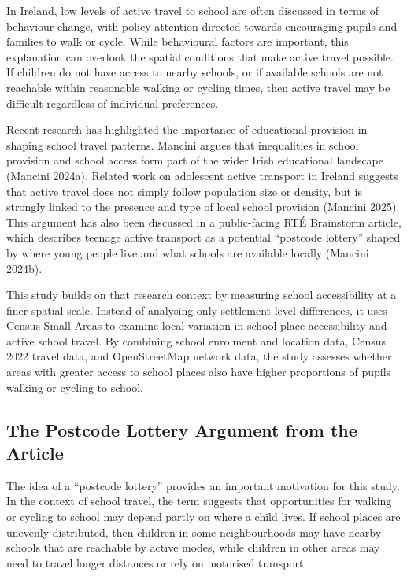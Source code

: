 \documentclass{article}
\begin{document}
In Ireland, low levels of active travel to school are often discussed in
terms of behaviour change, with policy attention directed towards
encouraging pupils and families to walk or cycle. While behavioural
factors are important, this explanation can overlook the spatial
conditions that make active travel possible. If children do not have
access to nearby schools, or if available schools are not reachable
within reasonable walking or cycling times, then active travel may be
difficult regardless of individual preferences.

Recent research has highlighted the importance of educational provision
in shaping school travel patterns. Mancini argues that inequalities in
school provision and school access form part of the wider Irish
educational landscape (Mancini 2024a). Related work on adolescent active
transport in Ireland suggests that active travel does not simply follow
population size or density, but is strongly linked to the presence and
type of local school provision (Mancini 2025). This argument has also
been discussed in a public-facing RTÉ Brainstorm article, which
describes teenage active transport as a potential ``postcode lottery''
shaped by where young people live and what schools are available locally
(Mancini 2024b).

This study builds on that research context by measuring school
accessibility at a finer spatial scale. Instead of analysing only
settlement-level differences, it uses Census Small Areas to examine
local variation in school-place accessibility and active school travel.
By combining school enrolment and location data, Census 2022 travel
data, and OpenStreetMap network data, the study assesses whether areas
with greater access to school places also have higher proportions of
pupils walking or cycling to school.

\subsection{The Postcode Lottery Argument from the
Article}\label{the-postcode-lottery-argument-from-the-article}

The idea of a ``postcode lottery'' provides an important motivation for
this study. In the context of school travel, the term suggests that
opportunities for walking or cycling to school may depend partly on
where a child lives. If school places are unevenly distributed, then
children in some neighbourhoods may have nearby schools that are
reachable by active modes, while children in other areas may need to
travel longer distances or rely on motorised transport.
\end{document}
